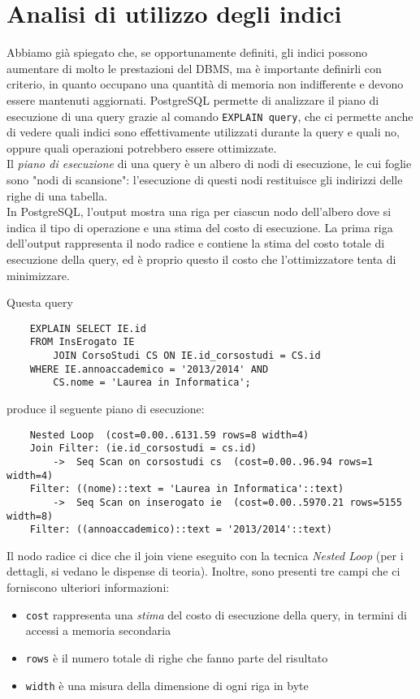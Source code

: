 \documentclass[12pt,a4paper]{book}
\begin{document}
	\section{Analisi di utilizzo degli indici}
	Abbiamo già spiegato che, se opportunamente definiti, gli indici possono aumentare di molto le prestazioni del DBMS, ma è importante definirli con criterio, in quanto occupano una quantità di memoria non indifferente e devono essere mantenuti aggiornati. PostgreSQL permette di analizzare il piano di esecuzione di una query grazie al comando \texttt{EXPLAIN query}, che ci permette anche di vedere quali indici sono effettivamente utilizzati durante la query e quali no, oppure quali operazioni potrebbero essere ottimizzate.\\
	Il \textit{piano di esecuzione} di una query è un albero di nodi di esecuzione, le cui foglie sono "nodi di scansione": l'esecuzione di questi nodi restituisce gli indirizzi delle righe di una tabella.\\
	In PostgreSQL, l'output mostra una riga per ciascun nodo dell'albero dove si indica il tipo di operazione e una stima del costo di esecuzione. La prima riga dell'output rappresenta il nodo radice e contiene la stima del costo totale di esecuzione della query, ed è proprio questo il costo che l'ottimizzatore tenta di minimizzare.\\
	\begin{tcolorbox}[enhanced jigsaw, breakable,title=Esempio, title filled]
	Questa query
	\begin{lstlisting}
	EXPLAIN SELECT IE.id
	FROM InsErogato IE
		JOIN CorsoStudi CS ON IE.id_corsostudi = CS.id
	WHERE IE.annoaccademico = '2013/2014' AND 
		CS.nome = 'Laurea in Informatica';
	\end{lstlisting}
	produce il seguente piano di esecuzione:
	\begin{lstlisting}
	Nested Loop  (cost=0.00..6131.59 rows=8 width=4)
	Join Filter: (ie.id_corsostudi = cs.id)
		->  Seq Scan on corsostudi cs  (cost=0.00..96.94 rows=1 width=4)
	Filter: ((nome)::text = 'Laurea in Informatica'::text)
		->  Seq Scan on inserogato ie  (cost=0.00..5970.21 rows=5155 width=8)
	Filter: ((annoaccademico)::text = '2013/2014'::text)
	\end{lstlisting}
	\end{tcolorbox}
	Il nodo radice ci dice che il join viene eseguito con la tecnica \textit{Nested Loop} (per i dettagli, si vedano le dispense di teoria). Inoltre, sono presenti tre campi che ci forniscono ulteriori informazioni:
	\begin{itemize}
		\item \texttt{cost} rappresenta una \textit{stima} del costo di esecuzione della query, in termini di accessi a memoria secondaria
		\item \texttt{rows} è il numero totale di righe che fanno parte del risultato
		\item \texttt{width} è una misura della dimensione di ogni riga in byte
	\end{itemize}
\end{document}
